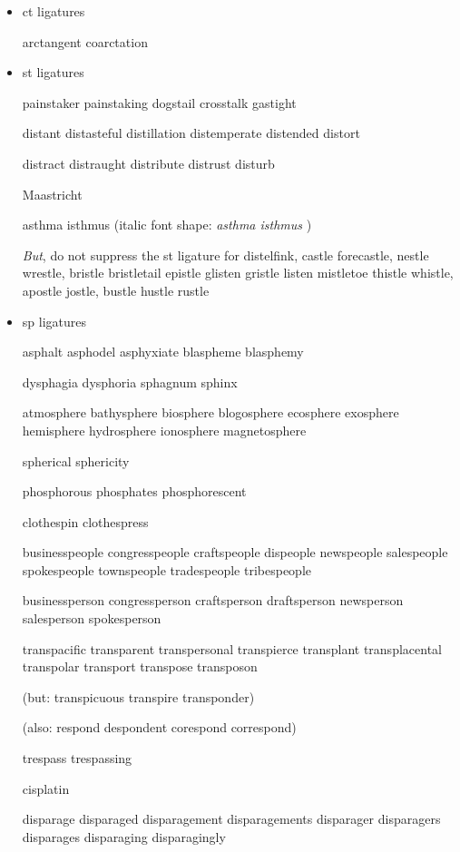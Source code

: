 \begin{itemize}

\item ct ligatures

arctangent coarctation 


\item st ligatures

painstaker painstaking dogstail crosstalk gastight

distant distasteful distillation distemperate distended distort

distract distraught distribute distrust disturb

Maastricht

asthma isthmus (italic font shape: \emph{asthma isthmus} )



\emph{But}, do not suppress the st ligature for  distelfink, castle forecastle, nestle wrestle, bristle bristletail epistle glisten gristle listen mistletoe thistle whistle, apostle jostle, bustle hustle rustle 




\item sp ligatures

asphalt asphodel asphyxiate blaspheme blasphemy

dysphagia dysphoria sphagnum sphinx

atmosphere bathysphere biosphere blogosphere ecosphere exosphere hemisphere hydrosphere ionosphere magnetosphere

spherical sphericity

phosphorous phosphates phosphorescent

clothespin clothespress

businesspeople congresspeople craftspeople dispeople newspeople salespeople spokespeople townspeople tradespeople tribespeople

businessperson congressperson craftsperson draftsperson newsperson salesperson spokesperson

transpacific transparent transpersonal transpierce  transplant transplacental transpolar transport transpose transposon

(but: transpicuous transpire transponder)

(also: respond despondent corespond correspond)

trespass trespassing

cisplatin

disparage disparaged disparagement disparagements disparager disparagers disparages disparaging disparagingly


\end{itemize}
